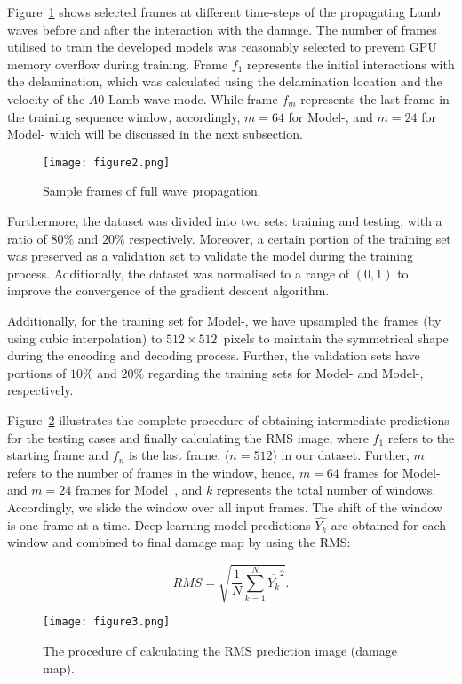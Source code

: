 \begin{sloppypar}
	Figure~\ref{fig:Full_wave} shows selected frames at different time-steps of the propagating Lamb waves before and after the interaction with the damage.
	The number of frames utilised to train the developed models was reasonably selected to prevent GPU memory overflow during training. 
	Frame \(f_{1}\) represents the initial interactions with the delamination, which was calculated using the delamination location and the velocity of the \(A0\) Lamb wave mode.
	While frame \(f_{m}\) represents the last frame in the training sequence window, accordingly, \(m=64\) for Model-, and \(m=24\) for Model- which will be discussed in the next subsection.
	\begin{figure}[!ht]
		\centering
		\texttt{[image: figure2.png]}
		\caption{Sample frames of full wave propagation.}
		\label{fig:Full_wave}
	\end{figure}
	
	Furthermore, the dataset was divided into two sets: training and testing, with a ratio of \(80\%\) and \(20\% \) respectively.
	Moreover, a certain portion of the training set was preserved as a validation set to validate the model during the training process.
	Additionally, the dataset was normalised to a range of \((0, 1)\) to improve the convergence of the gradient descent algorithm.
	
	Additionally, for the training set for Model-, we have upsampled the frames (by using cubic interpolation) to \(512\times512\)~pixels to maintain the symmetrical shape during the encoding and decoding process.
	Further, the validation sets have portions of \(10\%\) and \(20\%\) regarding the training sets for Model- and Model-, respectively.
	
	Figure~\ref{fig:Diagram_exp_predictions} illustrates the complete procedure of obtaining intermediate predictions for the testing cases and finally calculating the RMS image, where \(f_{1}\) refers to the starting frame and \(f_{n}\) is the last frame, (\(n=512\)) in our dataset.
	Further, \(m\) refers to the number of frames in the window, hence, \(m=64\) frames for Model- and \(m=24\) frames for Model~, and \(k\) represents the total number of windows.
	Accordingly, we slide the window over all input frames.
	The shift of the window is one frame at a time.
	Deep learning model predictions \(\hat{Y_k}\) are obtained for each window and combined to final damage map by using the RMS:
	
	\begin{equation}
		RMS = \sqrt{\frac{1}{N}\sum_{k=1}^{N}\hat{Y_k}^2}.	
		\label{RMS}
	\end{equation}
	\begin{figure}[!ht]
		\centering
		\texttt{[image: figure3.png]}
		\caption{The procedure of calculating the RMS prediction image (damage map).}
		\label{fig:Diagram_exp_predictions}
	\end{figure}
\end{sloppypar}
\newpage